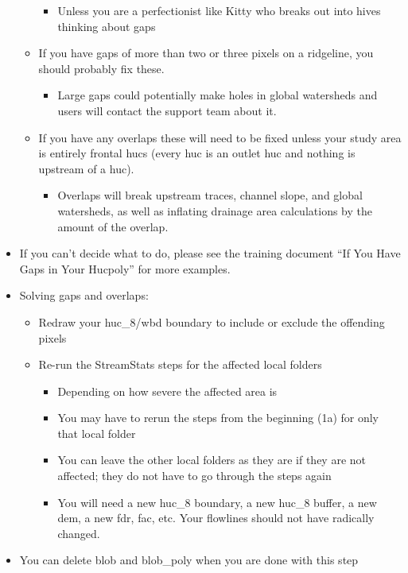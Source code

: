 \documentclass[letterpaper,10pt,english]{sphinxmanual}
\begin{document}
\begin{itemize}
\begin{itemize}
\begin{itemize}
\item {} 
Unless you are a perfectionist like Kitty who breaks out into hives thinking about gaps

\end{itemize}

\item {} 
If you have gaps of more than two or three pixels on a ridgeline, you should probably fix these.
\begin{itemize}
\item {} 
Large gaps could potentially make holes in global watersheds and users will contact the support team about it.

\end{itemize}

\item {} 
If you have any overlaps these will need to be fixed unless your study area is entirely frontal hucs (every huc is an outlet huc and nothing is upstream of a huc).
\begin{itemize}
\item {} 
Overlaps will break upstream traces, channel slope, and global watersheds, as well as inflating drainage area calculations by the amount of the overlap.

\end{itemize}

\end{itemize}

\item {} 
If you can’t decide what to do, please see the training document “If You Have Gaps in Your Hucpoly” for more examples.

\item {} 
Solving gaps and overlaps:
\begin{itemize}
\item {} 
Redraw your huc\_8/wbd boundary to include or exclude the offending pixels

\item {} 
Re-run the StreamStats steps for the affected local folders
\begin{itemize}
\item {} 
Depending on how severe the affected area is

\item {} 
You may have to rerun the steps from the beginning (1a) for only that local folder

\item {} 
You can leave the other local folders as they are if they are not affected; they do not have to go through the steps again

\item {} 
You will need a new huc\_8 boundary, a new huc\_8 buffer, a new dem, a new fdr, fac, etc. Your flowlines should not have radically changed.

\end{itemize}

\end{itemize}

\item {} 
You can delete blob and blob\_poly when you are done with this step

\end{itemize}
\end{document}

